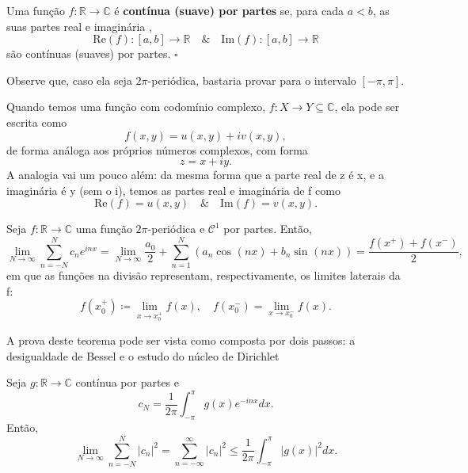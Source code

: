 \documentclass[../pde_notes.tex]{subfiles}
\begin{document}
\begin{def*}
	Uma função \(f:\mathbb{R}\rightarrow \mathbb{C}\) é \textbf{contínua (suave) por partes} se, para cada \(a<b\), as suas partes real e imaginária ,
	\[
		\mathrm{Re}(f):[a, b]\rightarrow \mathbb{R} \quad\&\quad \mathrm{Im}(f):[a, b]\rightarrow \mathbb{R}
	\]
	são contínuas (suaves) por partes. \(\square\)
\end{def*}
Observe que, caso ela seja \(2\pi \)-periódica, bastaria provar para o intervalo \([-\pi , \pi ]\).
\begin{tcolorbox}[
		skin=enhanced,
		title=Lembrete!,
		after title={\hfill Parte Real e Imaginária},
		fonttitle=\bfseries,
		sharp corners=downhill,
		colframe=black,
		colbacktitle=yellow!75!white,
		colback=yellow!30,
		colbacklower=black,
		coltitle=black,
		drop large lifted shadow
	]
	Quando temos uma função com codomínio complexo, \(f:X\rightarrow Y\subseteq \mathbb{C}\), ela pode ser escrita como
	\[
		f(x, y)=u(x, y)+iv(x, y),
	\]
	de forma análoga aos próprios números complexos, com forma
	\[
		z = x+iy.
	\]
	A analogia vai um pouco além: da mesma forma que a parte real de z é x, e a imaginária é y (sem o i), temos as partes real e imaginária de f como
	\[
		\mathrm{Re}(f)=u(x, y) \quad\&\quad \mathrm{Im}(f)=v(x, y).
	\]
\end{tcolorbox}
\hypertarget{ponintwise_convergence}{\begin{theorem*}
		Seja \(f:\mathbb{R}\rightarrow \mathbb{C}\) uma função \(2\pi \)-periódica e \(\mathcal{C}^{1}\) por partes. Então,
		\[
			\lim_{N\to \infty}\sum\limits_{n=-N}^{N}c_{n}e^{inx}=\lim_{N\to \infty}\frac{a_{0}}{2}+\sum\limits_{n=1}^{N}(a_{n}\cos^{}{(nx)}+b_{n}\sin^{}{(nx)})=\frac{f(x^{+})+f(x^{-})}{2},
		\]
		em que as funções na divisão representam, respectivamente, os limites laterais da f:
		\[
			f(x_{0}^{+})\coloneqq \lim_{x\to x_{0}^{+}}f(x),\quad f(x_{0}^{-})=\lim_{x\to x_{0}^{-}}f(x).
		\]
	\end{theorem*}}
A prova deste teorema pode ser vista como composta por dois passos: a desigualdade de Bessel e o estudo do núcleo de Dirichlet
\hypertarget{bessel_inequality}{
	\begin{prop*}
		Seja \(g:\mathbb{R}\rightarrow \mathbb{C}\) contínua por partes e
		\[
			c_{N}=\frac{1}{2\pi }\int_{-\pi }^{\pi }g(x)e^{-inx}dx.
		\]
		Então,
		\[
			\lim_{N\to \infty}\sum\limits_{n=-N}^{N}|c_{n}|^{2}=\sum\limits_{n=-\infty}^{\infty}|c_{n}|^{2}\leq \frac{1}{2\pi }\int_{-\pi }^{\pi }|g(x)|^{2}dx.
		\]
	\end{prop*}
}
\end{document}
